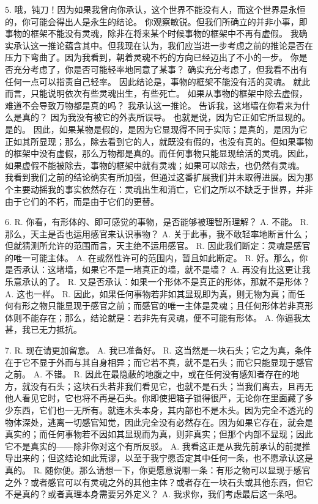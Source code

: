 5.  哦，钝刀！因为如果我曾向你承认，这个世界不能没有人，而这个世界是永恒的，你可能会得出人是永生的结论。 你观察敏锐。但我们所确立的并非小事，即事物的框架不能没有灵魂，除非在将来某个时候事物的框架中不再有虚假。 我确实承认这一推论蕴含其中。但我现在认为，我们应当进一步考虑之前的推论是否在压力下弯曲了。因为我看到，朝着灵魂不朽的方向已经迈出了不小的一步。 你是否充分考虑了，你是否可能轻率地同意了某事？ 确实充分考虑了，但我看不出有任何一点可以指责自己轻率。 因此结论是，事物的框架不能没有活的灵魂。 就此而言，只能说明依次有些灵魂出生，有些死亡。 如果从事物的框架中除去虚假，难道不会导致万物都是真的吗？ 我承认这一推论。 告诉我，这堵墙在你看来为什么是真的？ 因为我没有被它的外表所误导。 也就是说，因为它正如它所显现的。 是的。 因此，如果某物是假的，是因为它显现得不同于实际；是真的，是因为它正如其所显现；那么，除去看到它的人，就既没有假的，也没有真的。但如果事物的框架中没有虚假，那么万物都是真的。而任何事物只能显现给活的灵魂。因此，如果虚假不能被除去，事物的框架中就有灵魂；如果可以除去，也仍然有灵魂。 我看到我们之前的结论确实有所加强，但通过这番扩展我们并未取得进展。因为那个主要动摇我的事实依然存在：灵魂出生和消亡，它们之所以不缺乏于世界，并非由于它们的不朽，而是由于它们的更替。\par

6. R. 你看，有形体的、即可感觉的事物，是否能够被理智所理解？ A. 不能。 R. 那么，天主是否也运用感官来认识事物？ A. 关于此事，我不敢轻率地断言什么；但就猜测所允许的范围而言，天主绝不运用感官。 R. 因此我们断定：灵魂是感官的唯一可能主体。 A. 在或然性许可的范围内，暂且如此断定。 R. 好。那么，你是否承认：这堵墙，如果它不是一堵真正的墙，就不是墙？ A. 再没有比这更让我乐意承认的了。 R. 又是否承认：如果一个形体不是真正的形体，那就不是形体？ A. 这也一样。 R. 因此，如果任何事物若非如其显现即为真，则无物为真；而任何有形之物只能显现于感官之前；而感官的唯一主体是灵魂；且任何形体若非真形体则不能存在；那么，结论就是：若非先有灵魂，便不可能有形体。 A. 你逼我太甚，我已无力抵抗。\par

7. R. 现在请更加留意。 A. 我已准备好。 R. 这当然是一块石头；它之为真，条件在于它不显于外而与其自身相异；而它若不真，就不是石头；而它只能显现于感官之前。 A. 不错。 R. 因此在最隐蔽的地腹之中，或在任何没有感知者存在的地方，就没有石头；这块石头若非我们看见它，也就不是石头；当我们离去，且再无他人看见它时，它也将不再是石头。你即使把箱子锁得很严，无论你在里面藏了多少东西，它们也一无所有。就连木头本身，其内部也不是木头。因为完全不透光的物体深处，逃离一切感官知觉，因此完全没有必然存在。因为如果它存在，就会是真实的；而任何事物若不因如其显现而为真，则非真实；但那个内部不显现；因此它不是真实的——除非你对这个有所反驳。 A. 我看这正是从我先前承认的前提推导出来的；但这结论如此荒谬，以至于我宁愿否定其中任何一条，也不愿承认这是真的。 R. 随你便。那么请想一下，你更愿意说哪一条：有形之物可以显现于感官之外？或者感官可以有灵魂之外的其他主体？或者存在一块石头或其他东西，但它不是真的？或者真理本身需要另外定义？ A. 我求你，我们考虑最后这一条吧。\par


